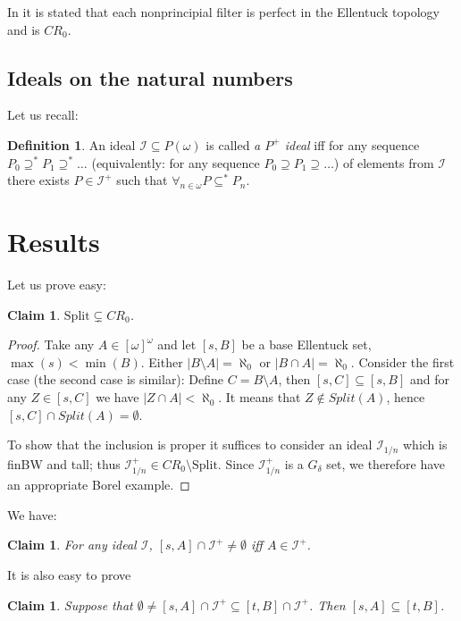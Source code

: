 \documentclass[12pt]{amsart}
\theoremstyle{plain}
\newtheorem{claim}[theorem]{Claim}
\theoremstyle{definition}
\newtheorem{definition}[theorem]{Definition}
\theoremstyle{remark}
\newcommand{\infsub}{[\omega]^{\omega}}
\newcommand{\calI}{\mathcal{I}}
\newcommand{\cI}{\mathcal{I}}
\newcommand{\idealHarmonicznyVar}{\cI_{1/n}}
\newcommand{\Split}{\mathrm{Split}}
\begin{document}
In \cite{NowikReardon2003} it is stated that each nonprincipial filter is
perfect in the Ellentuck topology and is $CR_0$.

\subsection{Ideals on the natural numbers}
Let us recall:
\begin{definition}
  An ideal $\calI \subseteq P(\omega)$ is called
{\it a $P^+$ ideal} iff for any sequence
$P_0 \supseteq^* P_1 \supseteq^* \ldots$
(equivalently: for any sequence $P_0 \supseteq P_1 \supseteq \ldots$) of
elements from $\calI$ there exists $P \in \calI^+$ such that
$\forall_{n \in \omega} P \subseteq^* P_n$.
\end{definition}

\section{Results}

Let us prove easy:
\begin{claim}
  $\Split\subsetneq CR_0$.
\end{claim}
\begin{proof}
  Take any $A \in \infsub$ and let $[s, B]$ be a base Ellentuck set, $\max(s) < \min(B)$.
Either $|B \setminus A| = \aleph_0$ or $|B \cap A| = \aleph_0$.
Consider the first case (the second case is similar): Define $C = B \setminus A$, 
then $[s, C] \subseteq [s, B]$ and for any $Z \in [s, C]$ we have
$|Z \cap A| < \aleph_0$. It means that
$Z \not\in \mathit{Split}(A)$, hence $[s, C] \cap \mathit{Split}(A) = \emptyset$.

To show that the inclusion is proper it suffices to consider an ideal 
$\idealHarmonicznyVar$ which is finBW and tall; thus 
$\idealHarmonicznyVar^+ \in CR_0 \setminus \mathrm{Split}$. Since 
$\idealHarmonicznyVar^+$ is a $G_\delta$ set, we therefore have an appropriate Borel example.
\end{proof}

We have:

\begin{claim}
  For any ideal $\calI$, $[s, A]\cap \calI^+ \not= \emptyset$
iff $A\in\calI^+$.
\end{claim}

It is also easy to prove
\begin{claim}
  Suppose that $\emptyset \not= [s,A] \cap \calI^+ \subseteq [t,B] \cap \calI^+$.
  Then $[s,A] \subseteq [t,B]$.
\end{claim}
\end{document}
